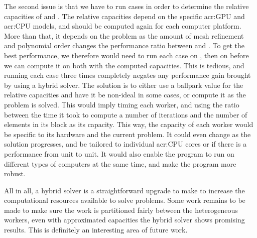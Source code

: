 The second issue is that we have to run cases in order to determine the relative capacities of
 and . The relative capacities depend on the specific
\acrshort{acr:GPU} and \acrshort{acr:CPU} models, and should be computed again for each computer
platform. More than that, it depends on the problem as the amount of mesh refinement and
polynomial order changes the performance ratio between  and
. To get the best performance, we therefore would need to run each case on
, then on  before we can compute it on both with the
computed capacities. This is tedious, and running each case three times completely negates any
performance gain brought by using a hybrid solver. The solution is to either use a ballpark value
for the relative capacities and have it be non-ideal in some cases, or compute it as the problem is
solved. This would imply timing each worker, and using the ratio between the time it took to compute
a number of iterations and the number of elements in its block  as its capacity. This way, the
capacity of each worker would be specific to its hardware and the current problem. It could even
change as the solution progresses, and be tailored to individual \acrshort{acr:CPU} cores or
 if there is a performance from unit to unit. It would also enable the program
to run on different types of computers at the same time, and make the program more robust.

All in all, a hybrid solver is a straightforward upgrade to make to increase the computational
resources available to solve problems. Some work remains to be made to make sure the work is
partitioned fairly between the heterogeneous workers, even with approximated capacities the hybrid
solver shows promising results. This is definitely an interesting area of future work. 
